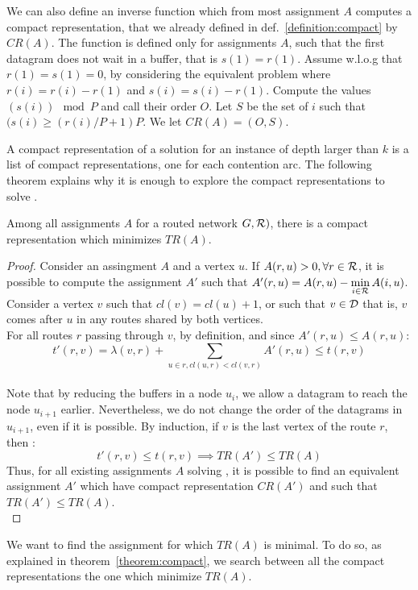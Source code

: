 \documentclass[english]{article}
\begin{document}
We can also define an inverse function which from most assignment $A$ computes a compact representation, that we already defined in def.~\ref{definition:compact} by $CR(A)$. The function is defined only for
assignments $A$, such that the first datagram does not wait in a buffer, that is $s(1) = r(1)$. Assume w.l.o.g that $r(1) = s(1) = 0$, by considering the equivalent problem where $r(i)= r(i) -r(1)$ and $s(i) = s(i) - r(1)$.
Compute the values $(s(i))\mod P$ and  call their order $O$. Let 
 $S$ be the set of $i$ such that $(s(i) \geq (r(i) / P + 1) P$. We let $CR(A) = (O,S)$.

A compact representation of a solution for an instance of depth larger than $k$
is a list of compact representations, one for each contention arc. The following theorem explains why it is enough to explore the compact representations to solve \spall.

\begin{theorem}
Among all assignments $A$ for a routed network $G,{\cal R})$, there is a compact representation which minimizes $TR(A)$.
\label{theorem:compact}
\end{theorem}
\begin{proof}
Consider an assingment $A$ and a vertex $u$.
If $A(r,u) > 0, \forall r \in {\cal R}$, it is possible to compute the assignment $A'$ such that
$A'(r,u) = A(r,u)-\min\limits_{i \in {\cal R}} A(i,u)$. Consider a vertex $v$ such that $cl(v) = cl(u) +1$, or such that $v \in {\cal D}$ that is, $v$ comes after $u$ in any routes shared by both vertices.\\
For all routes $r$ passing through $v$, by definition, and since $A'(r,u) \leq A(r,u)$: $$t'(r,v) = \lambda(v,r) + \sum_{u \in r, cl(u,r) < cl(v,r)} A'(r,u)  \leq t(r,v)$$\\
Note that by reducing the buffers in a node $u_i$, we allow a datagram to reach the node $u_{i+1}$ earlier. Nevertheless, we do not change the order of the datagrams in $u_{i+1}$, even if it is possible.
By induction, if $v$ is the last vertex of the route $r$, then : $$t'(r,v) \leq t(r,v) \implies TR(A') \leq TR(A)$$
Thus, for all existing assignments $A$ solving \spall, it is possible to find an equivalent assignment $A'$ which have compact representation $CR(A')$ and such that $TR(A') \leq TR(A)$.\\
\end{proof}


We want to find the assignment for which $TR(A)$ is minimal. To do so, as explained in theorem~\ref{theorem:compact}, we search between all the compact representations the one which minimize $TR(A)$.
\end{document}
